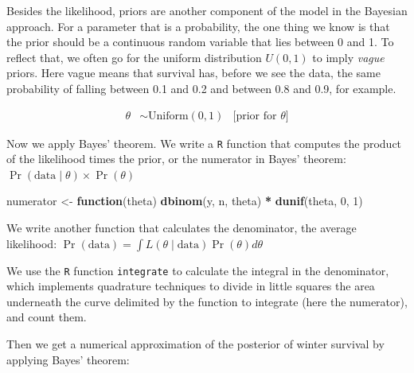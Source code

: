 \documentclass[
  12pt,
]{krantz}
\newenvironment{Shaded}{\begin{snugshade}}{\end{snugshade}}
\newcommand{\ControlFlowTok}[1]{\textcolor[rgb]{0.13,0.29,0.53}{\textbf{#1}}}
\newcommand{\DecValTok}[1]{\textcolor[rgb]{0.00,0.00,0.81}{#1}}
\newcommand{\FunctionTok}[1]{\textcolor[rgb]{0.13,0.29,0.53}{\textbf{#1}}}
\newcommand{\NormalTok}[1]{#1}
\newcommand{\OtherTok}[1]{\textcolor[rgb]{0.56,0.35,0.01}{#1}}
\newcommand{\SpecialCharTok}[1]{\textcolor[rgb]{0.81,0.36,0.00}{\textbf{#1}}}
\begin{document}
Besides the likelihood, priors are another component of the model in the Bayesian approach. For a parameter that is a probability, the one thing we know is that the prior should be a continuous random variable that lies between 0 and 1. To reflect that, we often go for the uniform distribution \(U(0,1)\) to imply \emph{vague} priors. Here vague means that survival has, before we see the data, the same probability of falling between 0.1 and 0.2 and between 0.8 and 0.9, for example.

\begin{align*}
\theta &\sim \text{Uniform}(0, 1) &\text{[prior for }\theta \text{]}
\end{align*}

Now we apply Bayes' theorem. We write a \texttt{R} function that computes the product of the likelihood times the prior, or the numerator in Bayes' theorem: \(\Pr(\text{data} \mid \theta) \times \Pr(\theta)\)

\begin{Shaded}
\begin{Highlighting}[]
\NormalTok{numerator }\OtherTok{\textless{}{-}} \ControlFlowTok{function}\NormalTok{(theta) }\FunctionTok{dbinom}\NormalTok{(y, n, theta) }\SpecialCharTok{*} \FunctionTok{dunif}\NormalTok{(theta, }\DecValTok{0}\NormalTok{, }\DecValTok{1}\NormalTok{)}
\end{Highlighting}
\end{Shaded}

We write another function that calculates the denominator, the average likelihood: \(\Pr(\text{data}) = \int{L(\theta \mid \text{data}) \Pr(\theta) d\theta}\)

\begin{Shaded}
\end{Shaded}

We use the \texttt{R} function \texttt{integrate} to calculate the integral in the denominator, which implements quadrature techniques to divide in little squares the area underneath the curve delimited by the function to integrate (here the numerator), and count them.

Then we get a numerical approximation of the posterior of winter survival by applying Bayes' theorem:
\end{document}
